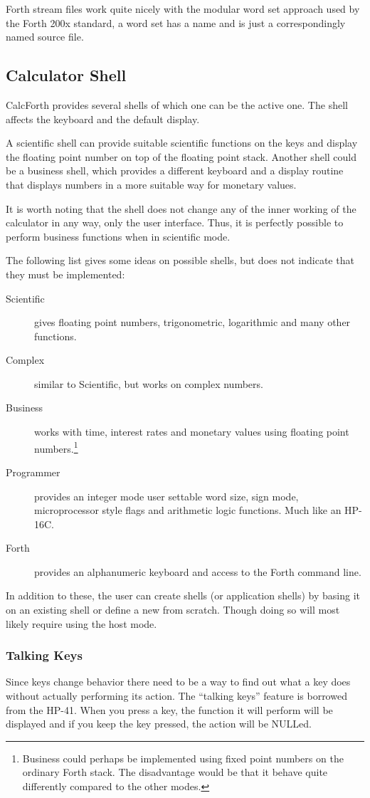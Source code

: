 \documentclass[a4paper]{article}
\begin{document}
Forth stream files work quite nicely with the modular word set approach used by the Forth 200x standard, a word set has a name and is just a correspondingly named source file.

\subsection{Calculator Shell}
CalcForth provides several shells of which one can be the active one. The shell affects the keyboard and the default display.

A scientific shell can provide suitable scientific functions on the keys and display the floating point number on top of the floating point stack. Another shell could be a business shell, which provides a different keyboard and a display routine that displays numbers in a more suitable way for monetary values.

It is worth noting that the shell does not change any of the inner working of the calculator in any way, only  the user interface. Thus, it is perfectly possible to perform business functions when in scientific mode.

The following list gives some ideas on possible shells, but does not indicate that they must be implemented:
\begin{description}
\item[Scientific] gives floating point numbers, trigonometric, logarithmic and many other functions.
\item[Complex] similar to Scientific, but works on complex numbers.
\item[Business] works with time, interest rates and monetary values using floating point numbers.\footnote{Business could perhaps be implemented using fixed point numbers on the ordinary Forth stack. The disadvantage would be that it behave quite differently compared to the other modes.}
\item[Programmer] provides an integer mode user settable word size, sign mode, microprocessor style flags and arithmetic logic functions. Much like an HP-16C.
\item[Forth] provides an alphanumeric keyboard and access to the Forth command line.
\end{description}

In addition to these, the user can create shells (or application shells) by basing it on an existing shell or define a new from scratch. Though doing so will most likely require using the host mode.

\subsubsection{Talking Keys}
Since keys change behavior there need to be a way to find out what a key does without actually performing its action. The ``talking keys'' feature is borrowed from the HP-41. When you press a key, the function it will perform will be displayed and if you keep the key pressed, the action will be NULLed.
\end{document}
